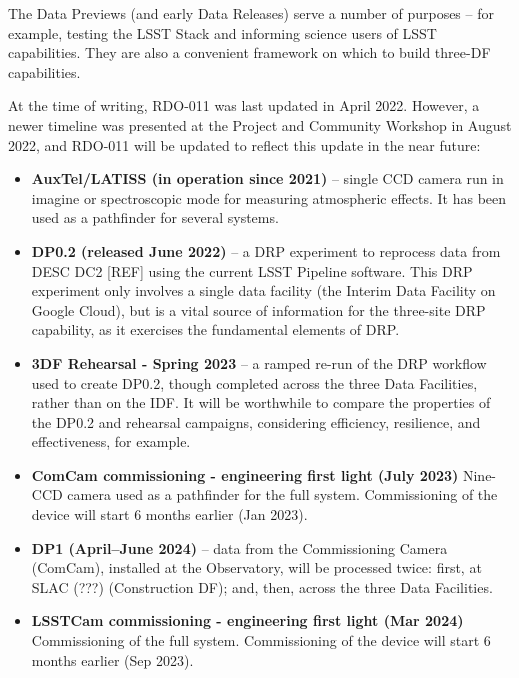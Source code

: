 The Data Previews (and early Data Releases) serve a number of purposes
-- for example, testing the LSST Stack and informing science users of
LSST capabilities. They are also a convenient framework on which
to build three-DF capabilities.

At the time of writing, RDO-011 was last updated in April
2022. However, a newer timeline was presented at the Project and
Community Workshop in August 2022, and RDO-011 will be updated to
reflect this update in the near future:

\begin{itemize}

\item {\bf AuxTel/LATISS (in operation since 2021)} -- single CCD
  camera run in imagine or spectroscopic mode for measuring
  atmospheric effects. It has been used as a pathfinder for several
  systems.
  
\item {\bf DP0.2 (released June 2022)} -- a DRP experiment to
  reprocess data from DESC DC2 [REF] using the current LSST Pipeline
  software. This DRP experiment only involves a single data facility
  (the Interim Data Facility on Google Cloud), but is a vital source
  of information for the three-site DRP capability, as it exercises
  the fundamental elements of DRP.
  
\item {\bf 3DF Rehearsal - Spring 2023} -- a ramped re-run of the DRP workflow used to create DP0.2, though
  completed across the three Data Facilities, rather than on the IDF. It
  will be worthwhile to compare the properties of the DP0.2 and rehearsal
  campaigns, considering efficiency, resilience, and effectiveness,
  for example.

\item{\bf ComCam commissioning - engineering first light (July 2023)}
  Nine-CCD camera used as a pathfinder for the full
  system. Commissioning of the device will start 6 months earlier (Jan
  2023).
  
\item {\bf DP1 (April--June 2024)} -- data from the Commissioning
  Camera (ComCam), installed at the Observatory, will be processed
  twice: first, at SLAC (???) (Construction DF); and, then, across the
  three Data Facilities.

 \item{\bf LSSTCam commissioning - engineering first light (Mar 2024)}
   Commissioning of the full system. Commissioning of the device will
   start 6 months earlier (Sep 2023).
  

\end{itemize}
